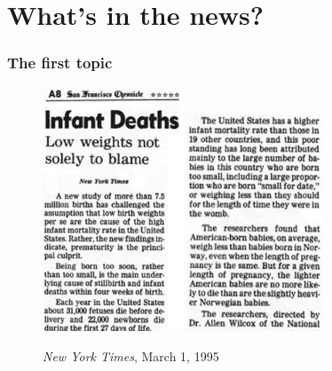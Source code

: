 \documentclass[compress,handout,10pt]{beamer}
\begin{document}
\section{What's in the news?}
\begin{frame}
    \frametitle{The first topic}
    \begin{figure}
    \caption{\emph{New York Times}, March 1, 1995} 
        \centering    
        \includegraphics[width=0.37\textwidth]{images/OnInfantDeathPart1.png}
        \includegraphics[width=0.37\textwidth]{images/OnInfantDeathPart2.png}
    \end{figure}
\end{frame}
\end{document}
